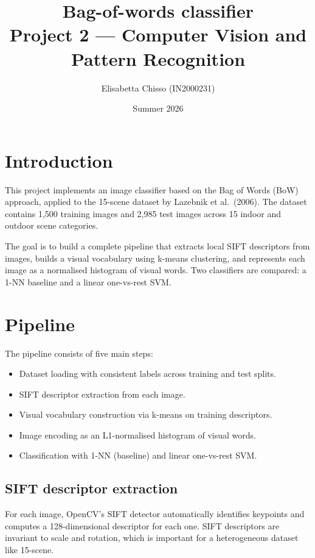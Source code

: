 \documentclass[11pt, a4paper]{article}
\title{\textbf{Bag-of-words classifier}\\[0.4em]
       \large Project 2 --- Computer Vision and Pattern Recognition}
\author{Elisabetta Chisso (IN2000231)}
\date{Summer 2026}
\begin{document}
\maketitle
\thispagestyle{empty}

\section{Introduction}

This project implements an image classifier based on the Bag of
Words (BoW) approach, applied to the 15-scene dataset by Lazebnik et
al.~(2006). The dataset contains 1,500 training images and 2,985 test
images across 15 indoor and outdoor scene categories.

The goal is to build a complete pipeline that extracts local SIFT
descriptors from images, builds a visual vocabulary using k-means
clustering, and represents each image as a normalised histogram of
visual words. Two classifiers are compared: a 1-NN baseline and a
linear one-vs-rest SVM.

\section{Pipeline}

The pipeline consists of five main steps:
\begin{itemize}
    \item Dataset loading with consistent labels across training and test splits.
    \item SIFT descriptor extraction from each image.
    \item Visual vocabulary construction via k-means on training descriptors.
    \item Image encoding as an L1-normalised histogram of visual words.
    \item Classification with 1-NN (baseline) and linear one-vs-rest SVM.
\end{itemize}

\subsection{SIFT descriptor extraction}

For each image, OpenCV's SIFT detector automatically identifies
keypoints and computes a 128-dimensional descriptor for each one. SIFT
descriptors are invariant to scale and rotation, which is important for
a heterogeneous dataset like 15-scene.
\end{document}
